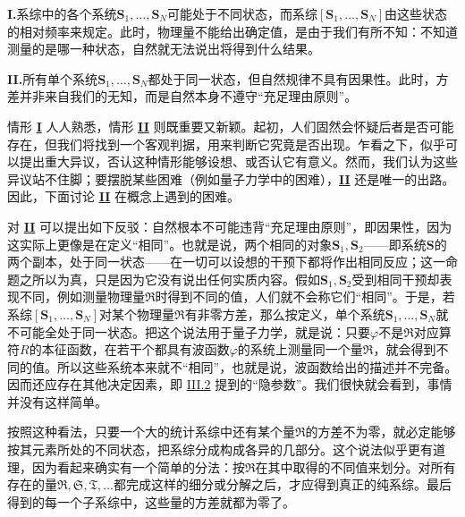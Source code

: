 \documentclass[fontsize=13pt,twoside,openany,headings=normal,parskip=false,bookmarkpackage=false,DIV=calc]{scrbook}
\begin{document}
\leavevmode{}\textbf{I.}\label{case:IV.1.I}系综中的各个系统$\boldsymbol{S}_1,\allowbreak \ldots,\allowbreak \boldsymbol{S}_N$可能处于不同状态，而系综$[\boldsymbol{S}_1,\allowbreak \ldots,\allowbreak \boldsymbol{S}_N]$由这些状态的相对频率来规定。此时，物理量不能给出确定值，是由于我们有所不知：不知道测量的是哪一种状态，自然就无法说出将得到什么结果。

\leavevmode{}\textbf{II.}\label{case:IV.1.II}所有单个系统$\boldsymbol{S}_1,\allowbreak \ldots,\allowbreak \boldsymbol{S}_N$都处于同一状态，但自然规律不具有因果性。此时，方差并非来自我们的无知，而是自然本身不遵守“充足理由原则”。

情形 \hyperref[case:IV.1.I]{\textbf{I}} 人人熟悉，情形 \hyperref[case:IV.1.II]{\textbf{II}} 则既重要又新颖。起初，人们固然会怀疑后者是否可能存在，但我们将找到一个客观判据，用来判断它究竟是否出现。乍看之下，似乎可以提出重大异议，否认这种情形能够设想、或否认它有意义。然而，我们认为这些异议站不住脚；要摆脱某些困难（例如量子力学中的困难），\hyperref[case:IV.1.II]{\textbf{II}} 还是唯一的出路。因此，下面讨论 \hyperref[case:IV.1.II]{\textbf{II}} 在概念上遇到的困难。

对 \hyperref[case:IV.1.II]{\textbf{II}} 可以提出如下反驳：自然根本不可能违背“充足理由原则”，即因果性，因为这实际上更像是在定义“相同”。也就是说，两个相同的对象$\boldsymbol{S}_1,\allowbreak \boldsymbol{S}_2$——即系统$\boldsymbol{S}$的两个副本，处于同一状态——在一切可以设想的干预下都将作出相同反应；这一命题之所以为真，只是因为它没有说出任何实质内容。假如$\boldsymbol{S}_1,\allowbreak \boldsymbol{S}_2$受到相同干预却表现不同，例如测量物理量$\mathfrak R$时得到不同的值，人们就不会称它们“相同”。于是，若系综$[\boldsymbol{S}_1,\allowbreak \ldots,\allowbreak \boldsymbol{S}_N]$对某个物理量$\mathfrak R$有非零方差，那么按定义，单个系统$\boldsymbol{S}_1,\allowbreak \ldots,\allowbreak \boldsymbol{S}_N$就不可能全处于同一状态。把这个说法用于量子力学，就是说：只要$\varphi$不是$\mathfrak R$对应算符$R$的本征函数，在若干个都具有波函数$\varphi$的系统上测量同一个量$\mathfrak R$，\hypertarget{origpage-161}{}\label{origpage-161}就会得到不同的值。所以这些系统本来就不“相同”，也就是说，波函数给出的描述并不完备。因而还应存在其他决定因素，即 \hyperref[sec:III.2]{III.2} 提到的“隐参数”。我们很快就会看到，事情并没有这样简单。

按照这种看法，只要一个大的统计系综中还有某个量$\mathfrak R$的方差不为零，就必定能够按其元素所处的不同状态，把系综分成构成各异的几部分。这个说法似乎更有道理，因为看起来确实有一个简单的分法：按$\mathfrak R$在其中取得的不同值来划分。对所有存在的量$\mathfrak R,\allowbreak \mathfrak S,\allowbreak \mathfrak T,\allowbreak \ldots$都完成这样的细分或分解之后，才应得到真正的纯系综。最后得到的每一个子系综中，这些量的方差就都为零了。
\end{document}
